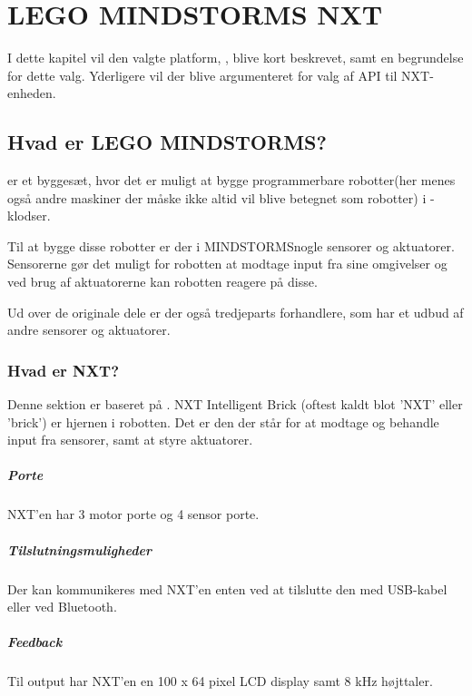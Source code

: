 
\chapter{LEGO MINDSTORMS NXT}
I dette kapitel vil den valgte platform, \legoms, blive kort beskrevet, samt en begrundelse for dette valg.
Yderligere vil der blive argumenteret for valg af API til NXT-enheden.

\section{Hvad er LEGO MINDSTORMS?}
\legoms er et byggesæt, hvor det er muligt at bygge programmerbare robotter(her menes også andre maskiner der måske ikke altid vil blive betegnet som robotter) i \lego-klodser.

Til at bygge disse robotter er der i MINDSTORMS\texttrademark nogle sensorer og aktuatorer. Sensorerne gør det muligt for robotten at modtage input fra sine omgivelser og ved brug af aktuatorerne kan robotten reagere på disse.

Ud over de originale \lego dele er der også tredjeparts forhandlere, som har et udbud af andre sensorer og aktuatorer.

\subsection{Hvad er NXT?}
Denne sektion er baseret på \cite{nxt}.
NXT Intelligent Brick (oftest kaldt blot 'NXT' eller 'brick') er hjernen i \legoms robotten.
Det er den der står for at modtage og behandle input fra sensorer, samt at styre aktuatorer.

\paragraph{Porte}
NXT'en har 3 motor porte og 4 sensor porte.

\paragraph{Tilslutningsmuligheder}
Der kan kommunikeres med NXT'en enten ved at tilslutte den med USB-kabel eller ved Bluetooth\textregistered.

\paragraph{Feedback}
Til output har NXT'en en 100 x 64 pixel LCD display samt 8 kHz højttaler.

